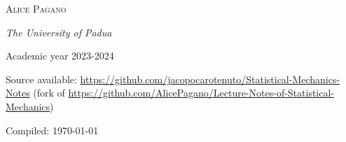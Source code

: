 \begin{titlepage}
	{\scshape\Large Alice Pagano \\} %
	
	\vspace{0.5\baselineskip} %
	
	
	
	
	\textit{The University of Padua } %
	
	\vspace{0.5\baselineskip}
	
	\small Academic year 2023-2024
	
	\vspace{4cm}
	
	Source available: \url{https://github.com/jacopocarotenuto/Statistical-Mechanics-Notes} (fork of \url{https://github.com/AlicePagano/Lecture-Notes-of-Statistical-Mechanics})
	\vspace{2cm}
	
	\footnotesize Compiled: \today %
	\vspace{0.5\baselineskip} 
	
	\vfill %

\end{titlepage}

\clearpage{\pagestyle{empty}\cleardoublepage}
